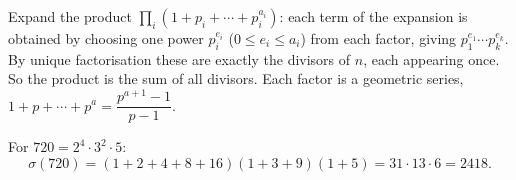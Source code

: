 Expand the product $\prod_i\left(1+p_i+\cdots+p_i^{a_i}\right)$: each term of the expansion is obtained by choosing one power $p_i^{e_i}$ ($0\le e_i\le a_i$) from each factor, giving $p_1^{e_1}\cdots p_k^{e_k}$. By unique factorisation these are exactly the divisors of $n$, each appearing once. So the product is the sum of all divisors. Each factor is a geometric series, $1+p+\cdots+p^a=\dfrac{p^{a+1}-1}{p-1}$.

For $720=2^4\cdot3^2\cdot5$:
\[
\sigma(720)=(1+2+4+8+16)(1+3+9)(1+5)=31\cdot13\cdot6=\boxed{2418}.
\]

